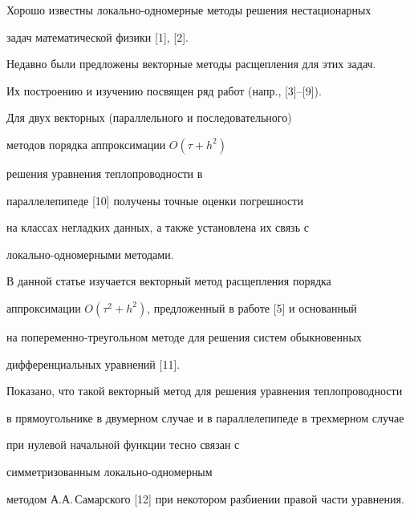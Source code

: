 \date{}




\pagestyle{plain} %







\maketitle


\label{begin}





Хорошо известны локально-одномерные методы решения нестационарных


задач математической физики [1], [2].


Недавно были предложены векторные методы расщепления для этих задач.


Их построению и изучению посвящен ряд работ (напр., [3]--[9]).


Для двух векторных (параллельного и последовательного)


методов порядка аппроксимации $O(\tau+h^2)$


решения уравнения теплопроводности в


параллелепипеде [10] получены точные оценки погрешности


на классах негладких данных, а также установлена их связь с


локально-одномерными методами.





В данной статье изучается векторный метод расщепления порядка 


аппроксимации $O(\tau^2+h^2)$, предложенный в работе [5] и основанный


на попеременно-треугольном методе для решения систем обыкновенных 


дифференциальных уравнений [11].


Показано, что такой векторный метод для решения уравнения теплопроводности


в прямоугольнике в двумерном случае и в параллелепипеде в трехмерном случае


при нулевой начальной функции тесно связан с 


симметризованным локально-одномерным


методом А.А.\,Самарского [12] при некотором разбиении правой части уравнения.


